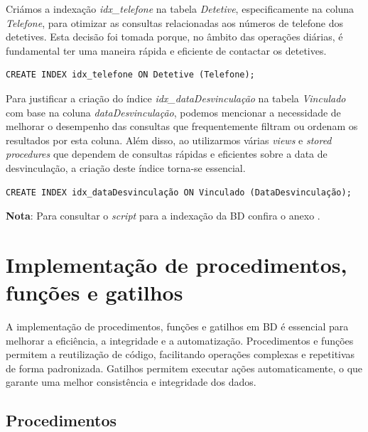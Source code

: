 \documentclass[a4paper,12pt]{scrreprt}
\begin{document}
Criámos a indexação \textit{idx\_telefone} na tabela \textit{Detetive}, especificamente na coluna \textit{Telefone}, para otimizar as consultas relacionadas aos números de telefone dos detetives. Esta decisão foi tomada porque, no âmbito das operações diárias, é fundamental ter uma maneira rápida e eficiente de contactar os detetives.

\vspace{0.4cm}
\begin{lstlisting}[escapechar=!, numbers=none]
CREATE INDEX idx_telefone ON Detetive (Telefone);
\end{lstlisting}
\vspace{0.6cm}

Para justificar a criação do índice \textit{idx\_dataDesvinculação} na tabela \textit{Vinculado} com base na coluna \textit{dataDesvinculação}, podemos mencionar a necessidade de melhorar o desempenho das consultas que frequentemente filtram ou ordenam os resultados por esta coluna. Além disso, ao utilizarmos várias \textit{views} e \textit{stored procedures} que dependem de consultas rápidas e eficientes sobre a data de desvinculação, a criação deste índice torna-se essencial.

\vspace{0.4cm}
\begin{lstlisting}[escapechar=!, numbers=none]
CREATE INDEX idx_dataDesvinculação ON Vinculado (DataDesvinculação);
\end{lstlisting}
\vspace{0.6cm}

\textbf{Nota}: Para consultar o \textit{script} para a indexação da BD confira o anexo \textit{}.

\clearpage


\section{Implementação de procedimentos, funções e gatilhos}

A implementação de procedimentos, funções e gatilhos em BD é essencial para melhorar a eficiência, a integridade e a automatização.
Procedimentos e funções permitem a reutilização de código, facilitando operações complexas e repetitivas de forma padronizada. Gatilhos permitem executar ações automaticamente, o que garante uma melhor consistência e integridade dos dados.

\subsection{Procedimentos}
\end{document}
